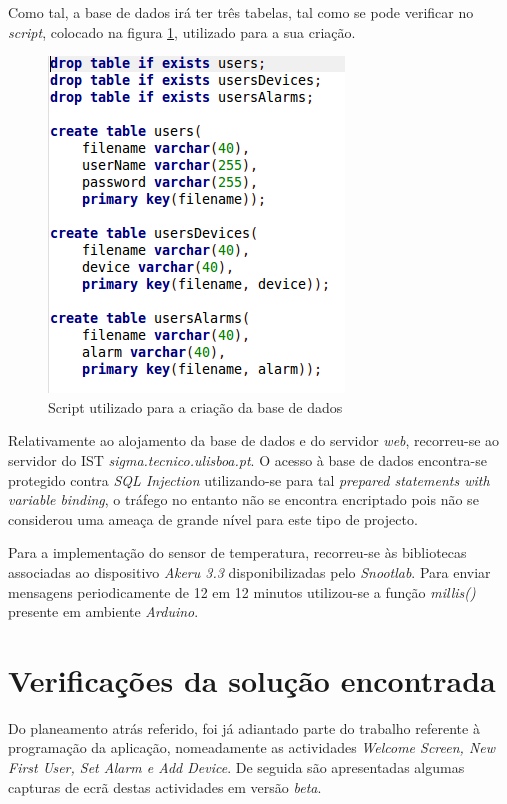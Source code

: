 \documentclass[a4paper]{article}
\begin{document}
Como tal, a base de dados irá ter três tabelas, tal como se pode verificar no \textit{script}, colocado na figura \ref{fig:db-script}, utilizado para a sua criação.

\begin{figure}[H]
  \centering
  \includegraphics[scale=0.50]{DB-script.png}
  \caption{Script utilizado para a criação da base de dados}
  \label{fig:db-script}
\end{figure}

Relativamente ao alojamento da base de dados e do servidor \textit{web}, recorreu-se ao servidor do IST \textit{sigma.tecnico.ulisboa.pt}. O acesso à base de dados encontra-se protegido contra \textit{SQL Injection} utilizando-se para tal \textit{prepared statements with variable binding}, o tráfego no entanto não se encontra encriptado pois não se considerou uma ameaça de grande nível para este tipo de projecto.

Para a implementação do sensor de temperatura, recorreu-se às bibliotecas associadas ao dispositivo \textit{Akeru 3.3} disponibilizadas pelo \textit{Snootlab}. Para enviar mensagens periodicamente de 12 em 12 minutos utilizou-se a função \textit{millis()} presente em ambiente \textit{Arduino}.

\section{Verificações da solução encontrada}

Do planeamento atrás referido, foi já adiantado parte do trabalho referente à programação da aplicação, nomeadamente as actividades \textit{Welcome Screen, New First User, Set Alarm e Add Device}. De seguida são apresentadas algumas capturas de ecrã destas actividades em versão \textit{beta}.
\end{document}
